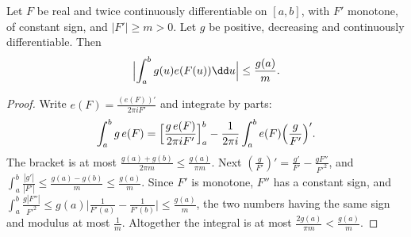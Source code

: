 \begin{lemma}\label{lem:firstderiv}
Let $F$ be real and twice continuously differentiable on $[a,b]$, with $F'$ monotone, of constant sign, and $|F'|\ge m>0$. Let $g$ be positive, decreasing and continuously differentiable. Then
\[
\Bigl|\int_a^bg(u)e(F(u))\dd u\Bigr|\le\frac{g(a)}m.
\]
\end{lemma}
\begin{proof}
Write $e(F)=\frac{(e(F))'}{2\pi iF'}$ and integrate by parts:
\[
\int_a^bg\,e(F)=\Bigl[\frac{g\,e(F)}{2\pi iF'}\Bigr]_a^b-\frac1{2\pi i}\int_a^be(F)\Bigl(\frac g{F'}\Bigr)'.
\]
The bracket is at most $\frac{g(a)+g(b)}{2\pi m}\le\frac{g(a)}{\pi m}$. Next $(\frac g{F'})'=\frac{g'}{F'}-\frac{gF''}{F'^2}$, and $\int_a^b\frac{|g'|}{|F'|}\le\frac{g(a)-g(b)}m\le\frac{g(a)}m$. Since $F'$ is monotone, $F''$ has a constant sign, and $\int_a^b\frac{g|F''|}{F'^2}\le g(a)\bigl|\frac1{F'(a)}-\frac1{F'(b)}\bigr|\le\frac{g(a)}m$, the two numbers having the same sign and modulus at most $\frac1m$. Altogether the integral is at most $\frac{2g(a)}{\pi m}<\frac{g(a)}m$.
\end{proof}


